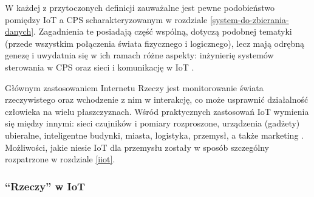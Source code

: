 \documentclass[a4paper, 12pt, twoside]{article}
\begin{document}
W każdej z przytoczonych
definicji zauważalne jest pewne podobieństwo pomiędzy IoT a CPS 
scharakteryzowanym w rozdziale \ref{system-do-zbierania-danych}. Zagadnienia te
posiadają część wspólną, dotyczą podobnej tematyki (przede wszystkim połączenia świata fizycznego i logicznego), 
lecz mają odrębną genezę i uwydatnia się w ich ramach różne aspekty: 
inżynierię systemów sterowania w CPS oraz sieci i komunikację w IoT \cite{cps-vs-iot}.

Głównym zastosowaniem Internetu Rzeczy jest monitorowanie świata rzeczywistego 
oraz wchodzenie z nim w interakcję, co może usprawnić działalność człowieka na wielu płaszczyznach.
Wśród praktycznych zastosowań IoT wymienia się między innymi:
sieci czujników i pomiary rozproszone, urządzenia (gadżety) ubieralne, 
inteligentne budynki, miasta, logistyka, przemysł, a także marketing \cite{internet-reczy}. 
Możliwości, jakie niesie IoT dla przemysłu zostały w sposób szczególny rozpatrzone 
w rozdziale \ref{iiot}.

\subsubsection{``Rzeczy'' w IoT}
\end{document}
